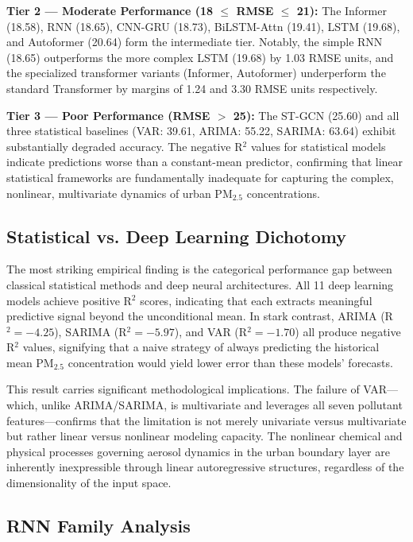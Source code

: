 \documentclass[conference]{IEEEtran}
\begin{document}
\textbf{Tier 2 --- Moderate Performance (18 $\leq$ RMSE $\leq$ 21):} The Informer (18.58), RNN (18.65), CNN-GRU (18.73), BiLSTM-Attn (19.41), LSTM (19.68), and Autoformer (20.64) form the intermediate tier. Notably, the simple RNN (18.65) outperforms the more complex LSTM (19.68) by 1.03 RMSE units, and the specialized transformer variants (Informer, Autoformer) underperform the standard Transformer by margins of 1.24 and 3.30 RMSE units respectively.

\textbf{Tier 3 --- Poor Performance (RMSE $>$ 25):} The ST-GCN (25.60) and all three statistical baselines (VAR: 39.61, ARIMA: 55.22, SARIMA: 63.64) exhibit substantially degraded accuracy. The negative R$^{2}$ values for statistical models indicate predictions worse than a constant-mean predictor, confirming that linear statistical frameworks are fundamentally inadequate for capturing the complex, nonlinear, multivariate dynamics of urban PM$_{2.5}$ concentrations.

\subsection{Statistical vs. Deep Learning Dichotomy}

The most striking empirical finding is the categorical performance gap between classical statistical methods and deep neural architectures. All 11 deep learning models achieve positive R$^{2}$ scores, indicating that each extracts meaningful predictive signal beyond the unconditional mean. In stark contrast, ARIMA (R$^{2} = -4.25$), SARIMA (R$^{2} = -5.97$), and VAR (R$^{2} = -1.70$) all produce negative R$^{2}$ values, signifying that a naive strategy of always predicting the historical mean PM$_{2.5}$ concentration would yield lower error than these models' forecasts.

This result carries significant methodological implications. The failure of VAR---which, unlike ARIMA/SARIMA, is multivariate and leverages all seven pollutant features---confirms that the limitation is not merely univariate versus multivariate but rather linear versus nonlinear modeling capacity. The nonlinear chemical and physical processes governing aerosol dynamics in the urban boundary layer are inherently inexpressible through linear autoregressive structures, regardless of the dimensionality of the input space.

\subsection{RNN Family Analysis}
\end{document}
